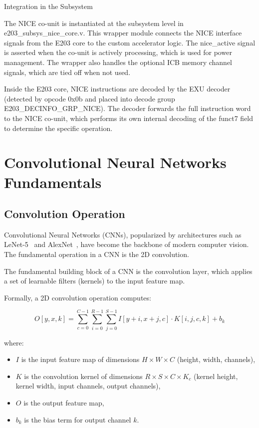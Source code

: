 Integration in the Subsystem


The NICE co-unit is instantiated at the subsystem level in e203\_subsys\_nice\_core.v. This wrapper module connects the NICE interface signals from the E203 core to the custom accelerator logic. The nice\_active signal is asserted when the co-unit is actively processing, which is used for power management. The wrapper also handles the optional ICB memory channel signals, which are tied off when not used.


Inside the E203 core, NICE instructions are decoded by the EXU decoder (detected by opcode 0x0b and placed into decode group E203\_DECINFO\_GRP\_NICE). The decoder forwards the full instruction word to the NICE co-unit, which performs its own internal decoding of the funct7 field to determine the specific operation.


\section{Convolutional Neural Networks Fundamentals}\label{sec:2_3}

\subsection{Convolution Operation}

Convolutional Neural Networks (CNNs), popularized by architectures such as LeNet-5~\cite{LENET} and AlexNet~\cite{ALEXNET}, have become the backbone of modern computer vision. The fundamental operation in a CNN is the 2D convolution.

The fundamental building block of a CNN is the convolution layer, which applies a set of learnable filters (kernels) to the input feature map.


Formally, a 2D convolution operation computes:


\[
O[y, x, k] = \sum_{c=0}^{C-1} \sum_{i=0}^{R-1} \sum_{j=0}^{S-1} I[y+i, x+j, c] \cdot K[i, j, c, k] + b_k
\]


where:
\begin{itemize}
\item \(I\) is the input feature map of dimensions \(H \times W \times C\) (height, width, channels),
\item \(K\) is the convolution kernel of dimensions \(R \times S \times C \times K_c\) (kernel height, kernel width, input channels, output channels),
\item \(O\) is the output feature map,
\item \(b_k\) is the bias term for output channel \(k\).
\end{itemize}


